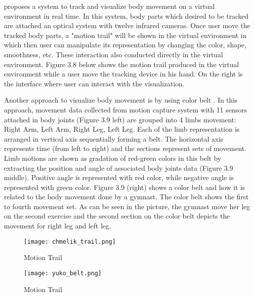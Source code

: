 \cite{chmelik} proposes a system to track and visualize body movement on a virtual environment in real time. In this system, body parts  which desired to be tracked are attached an optical system with twelve infrared cameras. Once user move the tracked body parts, a "motion trail" will be shown in the virtual environment in which then user can manipulate its representation by changing the color, shape, smoothness, etc. These interaction also conducted directly in the virtual environment. Figure 3.8 \cite{chmelik} below shows the motion trail produced in the virtual environment while a user move the tracking device in his hand. On the right is the interface where user can interact with the visualization.

Another approach to visualize body movement is by using color belt \cite{yuko}. In this approach, movement data collected from motion capture system with 11 sensors attached in body joints (Figure 3.9 left) are grouped into 4 limbs movement: Right Arm, Left Arm, Right Leg, Left Leg. Each of the limb representation is arranged in vertical axis sequentially forming a belt. The horizontal axis represents time (from left to right) and the sections represent sets of movement. Limb motions are shown as gradation of red-green colors in this belt by extracting the position and angle of associated body joints data (Figure 3.9 middle). Positive angle is represented with red color, while negative angle is represented with green color. Figure 3.9 (right) shows a color belt and how it is related to the body movement done by a gymnast. The color belt shows the first to fourth movement set. As can be seen in the picture, the gymnast move her leg on the second exercise and the second section on the color belt depicts the movement for right leg and left leg.

\begin{figure}
\centering
\texttt{[image: chmelik\_trail.png]}
\caption{Motion Trail}
\end{figure}

\begin{figure}
\centering
\texttt{[image: yuko\_belt.png]}
\caption{Motion Trail}
\end{figure}

